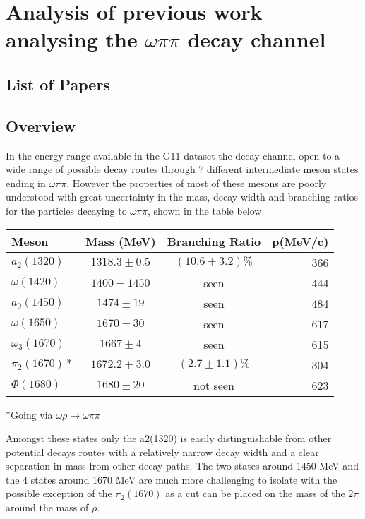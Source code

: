 \chapter{Analysis of previous work analysing the $\omega\pi\pi$ decay channel}

\section{List of Papers}

\section{Overview}

In the energy range available in the G11 dataset the decay channel open to a wide range of possible decay routes through 7 different intermediate meson states ending in $\omega\pi\pi$. However the properties of most of these mesons are poorly understood with great uncertainty in the mass, decay width and branching ratios for the particles decaying to $\omega\pi\pi$, shown in the table below.

\begin{center}
	\begin{tabular}{|l|c|c|r|}
		\hline
		Meson & Mass (MeV) & Branching Ratio & p(MeV/c)  \\ \hline
		$a_2(1320)$ & $1318.3 \pm 0.5$ & $(10.6 \pm 3.2)\%$  & 366\\
		$\omega(1420)$ & $1400-1450$ & seen & 444 \\
		$a_0(1450)$ & $1474 \pm 19$ & seen & 484 \\
		$\omega(1650)$ & $1670 \pm 30 $ & seen & 617 \\
		$\omega_3(1670)$ & $1667 \pm 4$ & seen & 615 \\
		$\pi_2(1670)*$ & $1672.2 \pm 3.0$ & $(2.7 \pm 1.1)\%$ & 304 \\
		$\Phi(1680)$ & $1680 \pm 20$ & not seen & 623 \\
		\hline
	\end{tabular}
\end{center}
*Going via $\omega\rho \rightarrow \omega\pi\pi$ 

Amongst these states only the a2(1320) is easily distinguishable from other potential decays routes with a relatively narrow decay width and a clear separation in mass from other decay paths. The two states around 1450 MeV and the 4 states around 1670 MeV are much more challenging to isolate with the possible exception of the $\pi_2(1670)$ as a cut can be placed on the mass of the $2\pi$ around the mass of $\rho$.


